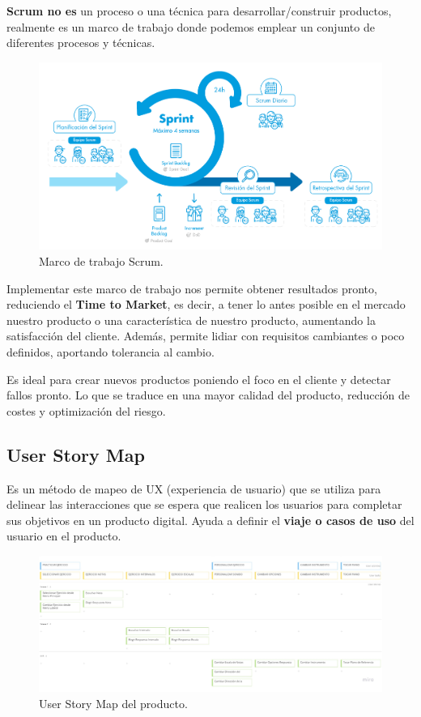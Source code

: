 \documentclass[12pt,twoside,titlepage]{report}
\begin{document}
\textbf{Scrum no es} un proceso o una técnica para desarrollar/construir productos, realmente es un marco de trabajo donde podemos emplear un conjunto de diferentes procesos y técnicas.

\begin{figure}[H]
    \centering
    \includegraphics[scale=0.39]{Scrum/Scrum}
    \caption{Marco de trabajo Scrum.}
    \label{fig:Scrum}
\end{figure}

Implementar este marco de trabajo nos permite obtener resultados pronto, reduciendo el \textbf{Time to Market}, es decir, a tener lo antes posible en el mercado nuestro producto o una característica de nuestro producto, aumentando la satisfacción del cliente. Además, permite lidiar con requisitos cambiantes o poco definidos, aportando tolerancia al cambio.

Es ideal para crear nuevos productos poniendo el foco en el cliente y detectar fallos pronto. Lo que se traduce en una mayor calidad del producto, reducción de costes y optimización del riesgo.
\cite{scrum2}

\subsection{User Story Map}

Es un método de mapeo de UX (experiencia de usuario) que se utiliza para delinear las interacciones que se espera que realicen los usuarios para completar sus objetivos en un producto digital. Ayuda a definir el \textbf{viaje o casos de uso} del usuario en el producto.
\cite{userStoryMap1}
\cite{userStoryMap2}
\cite{userStoryMap3}

\begin{figure}[H]
    \centering
    \includegraphics[width=\textwidth]{Scrum/UserStoryMap}
    \caption{User Story Map del producto.}
    \label{fig:UserStoryMap}
\end{figure}
\end{document}
